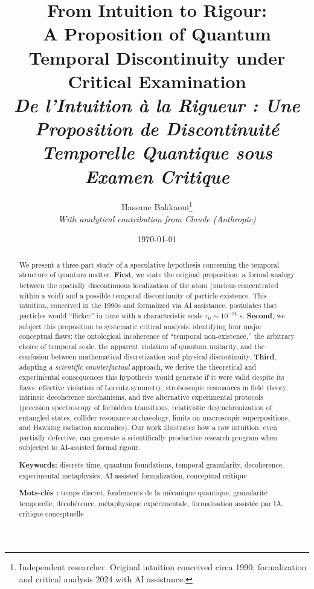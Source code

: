 \documentclass[11pt,a4paper]{article}
\title{\textbf{From Intuition to Rigour: \\ A Proposition of Quantum Temporal Discontinuity under Critical Examination}\\[0.5em]
\large\textit{De l'Intuition à la Rigueur : Une Proposition de Discontinuité Temporelle Quantique sous Examen Critique}}
\author{Hassane Bakkaoui\thanks{Independent researcher. Original intuition conceived circa 1990; formalization and critical analysis 2024 with AI assistance.} \\ \textit{With analytical contribution from Claude (Anthropic)}}
\date{\today}
\begin{document}
\maketitle

\begin{abstract}
We present a three-part study of a speculative hypothesis concerning the temporal structure of quantum matter. \textbf{First}, we state the original proposition: a formal analogy between the spatially discontinuous localization of the atom (nucleus concentrated within a void) and a possible temporal discontinuity of particle existence. This intuition, conceived in the 1990s and formalized via AI assistance, postulates that particles would ``flicker'' in time with a characteristic scale $\tau_0 \sim 10^{-24}$ s. \textbf{Second}, we subject this proposition to systematic critical analysis, identifying four major conceptual flaws: the ontological incoherence of ``temporal non-existence,'' the arbitrary choice of temporal scale, the apparent violation of quantum unitarity, and the confusion between mathematical discretization and physical discontinuity. \textbf{Third}, adopting a \textit{scientific counterfactual} approach, we derive the theoretical and experimental consequences this hypothesis would generate if it were valid despite its flaws: effective violation of Lorentz symmetry, stroboscopic resonances in field theory, intrinsic decoherence mechanisms, and five alternative experimental protocols (precision spectroscopy of forbidden transitions, relativistic desynchronization of entangled states, collider resonance archaeology, limits on macroscopic superpositions, and Hawking radiation anomalies). Our work illustrates how a raw intuition, even partially defective, can generate a scientifically productive research program when subjected to AI-assisted formal rigour.

\vspace{0.5em}
\noindent\textbf{Keywords:} discrete time, quantum foundations, temporal granularity, decoherence, experimental metaphysics, AI-assisted formalization, conceptual critique

\vspace{0.3em}
\noindent\textbf{Mots-clés :} temps discret, fondements de la mécanique quantique, granularité temporelle, décohérence, métaphysique expérimentale, formalisation assistée par IA, critique conceptuelle
\end{abstract}
\end{document}
